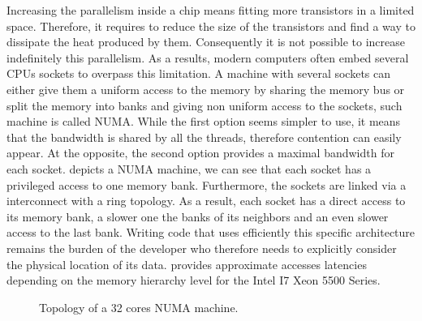 Increasing the parallelism inside a chip means fitting more transistors in a limited space.
Therefore, it requires to reduce the size of the transistors and find a way to dissipate the heat produced by them.
Consequently it is not possible to increase indefinitely this parallelism.
As a results, modern computers often embed several \glspl{CPU} sockets to overpass this limitation.
A machine with several sockets can either give them a uniform access to the memory by sharing the memory bus or split the memory into banks and giving non uniform access to the sockets, such machine is called \gls{NUMA}.
While the first option seems simpler to use, it means that the bandwidth is shared by all the threads, therefore contention can easily appear.
At the opposite, the second option provides a maximal bandwidth for each socket.
 depicts a \gls{NUMA} machine, we can see that each socket has a privileged access to one memory bank.
Furthermore, the sockets are linked via a interconnect with a ring topology.
As a result, each socket  has a direct access to its memory bank, a slower one the banks of its neighbors and an even slower access to the last bank.
Writing code that uses efficiently this specific architecture remains the burden of the developer who therefore needs to explicitly consider the physical location of its data.
 provides approximate accesses latencies depending on the memory hierarchy level for  the \gls{Intel} I7 Xeon 5500 Series.

\begin{figure}[htb]
    \centering
    
    \caption{Topology of a 32 cores NUMA machine.}
    \label{fig:topo-NUMA}
\end{figure}

